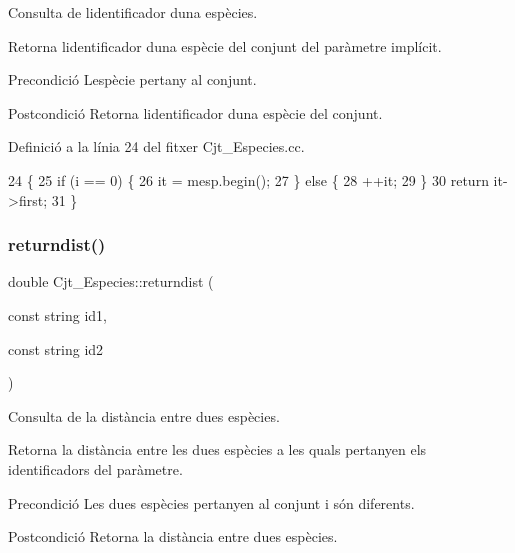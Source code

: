 Consulta de l\textquotesingle{}identificador d\textquotesingle{}una espècies. 

Retorna l\textquotesingle{}identificador d\textquotesingle{}una espècie del conjunt del paràmetre implícit.

\begin{DoxyPrecond}{Precondició}
L\textquotesingle{}espècie pertany al conjunt. 
\end{DoxyPrecond}
\begin{DoxyPostcond}{Postcondició}
Retorna l\textquotesingle{}identificador d\textquotesingle{}una espècie del conjunt. 
\end{DoxyPostcond}


Definició a la línia 24 del fitxer Cjt\+\_\+\+Especies.\+cc.


\begin{DoxyCode}
24                                    \{
25     \textcolor{keywordflow}{if} (i == 0) \{
26         it = mesp.begin();
27     \} \textcolor{keywordflow}{else} \{
28         ++it;
29     \}
30     \textcolor{keywordflow}{return} it->first;
31 \}
\end{DoxyCode}
\mbox{\label{class_cjt___especies_ae13d0a3a9f8b0ed9bba78b1c6c9d4eaa}} 
\subsubsection{\texorpdfstring{returndist()}{returndist()}}
{\footnotesize\ttfamily double Cjt\+\_\+\+Especies\+::returndist (\begin{DoxyParamCaption}\item[{const string}]{id1,  }\item[{const string}]{id2 }\end{DoxyParamCaption})}



Consulta de la distància entre dues espècies. 

Retorna la distància entre les dues espècies a les quals pertanyen els identificadors del paràmetre.

\begin{DoxyPrecond}{Precondició}
Les dues espècies pertanyen al conjunt i són diferents. 
\end{DoxyPrecond}
\begin{DoxyPostcond}{Postcondició}
Retorna la distància entre dues espècies. 
\end{DoxyPostcond}


